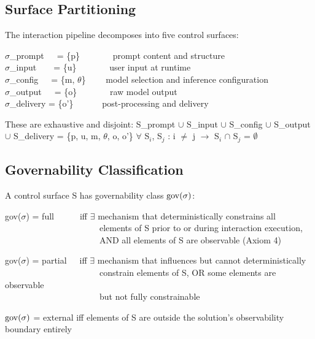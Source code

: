 \subsection{Surface Partitioning}


\begin{cdef}
The interaction pipeline decomposes into five control surfaces:

\begin{cladnote}
$\sigma$\_prompt~~~= \{p\}~~~~~~~\textemdash{} prompt content and structure\\
$\sigma$\_input~~~~= \{u\}~~~~~~~\textemdash{} user input at runtime\\
$\sigma$\_config~~~= \{m, $\theta$\}~~~~\textemdash{} model selection and inference configuration\\
$\sigma$\_output~~~= \{o\}~~~~~~~\textemdash{} raw model output\\
$\sigma$\_delivery = \{o'\}~~~~~~\textemdash{} post-processing and delivery\\
\end{cladnote}
These are exhaustive and disjoint: S\_\allowbreak{}prompt $\cup$ S\_\allowbreak{}input $\cup$ S\_\allowbreak{}config $\cup$ S\_\allowbreak{}output $\cup$ S\_\allowbreak{}delivery = \{p, u, m, $\theta$, o, o'\} $\forall$ S$_i$, S$_j$ : i $\neq$ j $\to$ S$_i$ $\cap$ S$_j$ = $\emptyset$

\end{cdef}


\subsection{Governability Classification}


\begin{cdef}[(Governability)]
A control surface S has governability class $\operatorname{gov}(\sigma)$:

\begin{claddisp}
gov($\sigma$) = full~~~~~~iff $\exists$ mechanism that deterministically constrains all\\
~~~~~~~~~~~~~~~~~~~~~~elements of S prior to or during interaction execution,\\
~~~~~~~~~~~~~~~~~~~~~~AND all elements of S are observable (Axiom 4)\\
\end{claddisp}
\begin{claddisp}
gov($\sigma$) = partial~~~iff $\exists$ mechanism that influences but cannot deterministically\\
~~~~~~~~~~~~~~~~~~~~~~constrain elements of S, OR some elements are observable\\
~~~~~~~~~~~~~~~~~~~~~~but not fully constrainable\\
\end{claddisp}
$\operatorname{gov}(\sigma)$ = external  iff elements of S are outside the solution's observability boundary entirely

\end{cdef}



